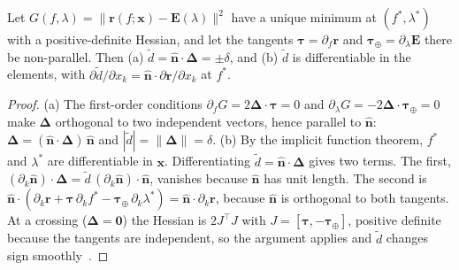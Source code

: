 \documentclass[make,article,submit,moreauthors]{Definitions/mdpi}
\begin{document}
\begin{Proposition}\label{prop:grad}
Let $G(f, \lambda) = \lVert\mathbf{r}(f; \mathbf{x}) - \mathbf{E}(\lambda)\rVert^2$ have a unique minimum at $(f^*, \lambda^*)$ with a positive-definite Hessian, and let the tangents $\boldsymbol\tau = \partial_f\mathbf{r}$ and $\boldsymbol\tau_\oplus = \partial_\lambda\mathbf{E}$ there be non-parallel. Then (a) $\tilde d = \hat{\mathbf{n}}\cdot\boldsymbol\Delta = \pm\delta$, and (b) $\tilde d$ is differentiable in the elements, with $\partial\tilde d/\partial x_k = \hat{\mathbf{n}}\cdot\partial\mathbf{r}/\partial x_k$ at $f^*$.
\end{Proposition}
\begin{proof}
(a) The first-order conditions $\partial_f G = 2\boldsymbol\Delta\cdot\boldsymbol\tau = 0$ and $\partial_\lambda G = -2\boldsymbol\Delta\cdot\boldsymbol\tau_\oplus = 0$ make $\boldsymbol\Delta$ orthogonal to two independent vectors, hence parallel to $\hat{\mathbf{n}}$: $\boldsymbol\Delta = (\hat{\mathbf{n}}\cdot\boldsymbol\Delta)\,\hat{\mathbf{n}}$ and $|\tilde d| = \lVert\boldsymbol\Delta\rVert = \delta$. (b) By the implicit function theorem, $f^*$ and $\lambda^*$ are differentiable in $\mathbf{x}$. Differentiating $\tilde d = \hat{\mathbf{n}}\cdot\boldsymbol\Delta$ gives two terms. The first, $(\partial_k\hat{\mathbf{n}})\cdot\boldsymbol\Delta = \tilde d\,(\partial_k\hat{\mathbf{n}})\cdot\hat{\mathbf{n}}$, vanishes because $\hat{\mathbf{n}}$ has unit length. The second is $\hat{\mathbf{n}}\cdot(\partial_k\mathbf{r} + \boldsymbol\tau\,\partial_k f^* - \boldsymbol\tau_\oplus\,\partial_k\lambda^*) = \hat{\mathbf{n}}\cdot\partial_k\mathbf{r}$, because $\hat{\mathbf{n}}$ is orthogonal to both tangents. At a crossing ($\boldsymbol\Delta = \mathbf{0}$) the Hessian is $2J^{\top}J$ with $J = [\boldsymbol\tau, -\boldsymbol\tau_\oplus]$, positive definite because the tangents are independent, so the argument applies and $\tilde d$ changes sign smoothly~\cite{gronchi2007}.
\end{proof}
\end{document}
